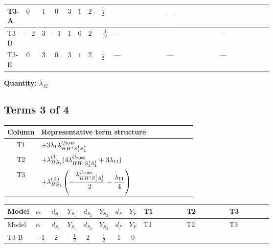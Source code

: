 \documentclass[8pt]{article}
\begin{document}
\begin{landscape}
\begin{longtable}{@{}llcccccc >{\raggedright\arraybackslash}p{0.21\linewidth} >{\raggedright\arraybackslash}p{0.21\linewidth} >{\raggedright\arraybackslash}p{0.21\linewidth}@{}}
\midrule
T3-A & $0$ & $1$ & $0$ & $3$ & $1$ & $2$ & $\frac{1}{2}$ & --- & --- & --- \\
\midrule
T3-D & $-2$ & $3$ & $-1$ & $1$ & $0$ & $2$ & $-\frac{1}{2}$ & --- & --- & --- \\
\midrule
T3-E & $0$ & $3$ & $0$ & $3$ & $1$ & $2$ & $\frac{1}{2}$ & --- & --- & --- \\
\midrule
\bottomrule
\end{longtable}
\clearpage
\noindent\textbf{Quantity: }$\lambda_{12}$\par\smallskip
\subsection*{Terms 3 of 4}
\begin{center}
\begin{tabular}{@{}c >{\raggedright\arraybackslash}p{0.82\linewidth}@{}}
\toprule
Column & Representative term structure \\
\midrule
T1 & \(\displaystyle +3 {\lambda_1} {\lambda_{H H^\dagger S_1^\dagger S_2^\dagger}^{\rm Cross}}\) \\
\midrule
T2 & \(\displaystyle +{\lambda_{HS_1}^{(1)}} (4 {\lambda_{H H^\dagger S_1^\dagger S_2^\dagger}^{\rm Cross}}+3 {\lambda_{11}})\) \\
\midrule
T3 & \(\displaystyle +{\lambda_{HS_1}^{(A)}} \left(-\frac{{\lambda_{H H^\dagger S_1^\dagger S_2^\dagger}^{\rm Cross}}}{2}-\frac{{\lambda_{11}}}{4}\right)\) \\
\midrule
\bottomrule
\end{tabular}
\end{center}
\smallskip
\tiny
\begin{longtable}{@{}llcccccc >{\raggedright\arraybackslash}p{0.21\linewidth} >{\raggedright\arraybackslash}p{0.21\linewidth} >{\raggedright\arraybackslash}p{0.21\linewidth}@{}}
\toprule
Model & $\alpha$ & $d_{S_1}$ & $Y_{S_1}$ & $d_{S_2}$ & $Y_{S_2}$ & $d_F$ & $Y_F$ & T1 & T2 & T3 \\
\midrule
\endfirsthead
\toprule
Model & $\alpha$ & $d_{S_1}$ & $Y_{S_1}$ & $d_{S_2}$ & $Y_{S_2}$ & $d_F$ & $Y_F$ & T1 & T2 & T3 \\
\midrule
\endhead
T3-B & $-1$ & $2$ & $-\frac{1}{2}$ & $2$ & $\frac{1}{2}$ & $1$ & $0$ & \scriptsize\adjustbox{max width=\linewidth}{$\begin{gathered} +3 {\lambda_1} {\lambda_{H H^\dagger S_1^\dagger S_2^\dagger}^{\rm Cross}}\end{gathered}$} & \scriptsize\adjustbox{max width=\linewidth}{$\begin{gathered} +{\lambda_{HS_1}^{(1)}} (4 {\lambda_{H H^\dagger S_1^\dagger S_2^\dagger}^{\rm Cross}}+3 {\lambda_{11}})\end{gathered}$} & \scriptsize\adjustbox{max width=\linewidth}{$\begin{gathered} +{\lambda_{HS_1}^{(A)}} \left(-\frac{{\lambda_{H H^\dagger S_1^\dagger S_2^\dagger}^{\rm Cross}}}{2}-\frac{{\lambda_{11}}}{4}\right)\end{gathered}$} \\

\end{longtable}
\end{landscape}
\end{document}
